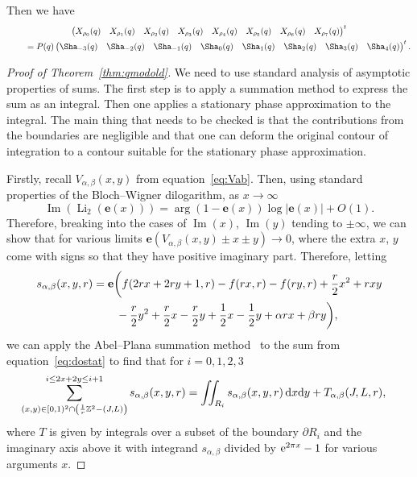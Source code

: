 \documentclass[pdftex]{sigma}
\numberwithin{equation}{section}
\def\BZ{\mathbb{Z}}
\def\be{\begin{equation}}
\def\ee{\end{equation}}
\def\Li{\mathrm{Li}}
\def\e{\mathbf e}
\def\WRT{\Sha}
\def\BZ{\mathbb Z}
\def\Li{\operatorname{Li}}
\def\Im{\operatorname{Im}}
\def\be{\begin{equation}}
\def\ee{\end{equation}}
\begin{document}
Then we have
\begin{gather}
\begin{pmatrix}
 X_{\rho_0}(q) &
 X_{\rho_1}(q) &
 X_{\rho_2}(q) &
 X_{\rho_3}(q) &
 X_{\rho_4}(q) &
 X_{\rho_5}(q) &
 X_{\rho_6}(q) &
 X_{\rho_7}(q)
\end{pmatrix}^{t}\label{eq:can.basis.Q}\\
\qquad{} =
P(q)
\begin{pmatrix}
 \WRT_{-3}(q) &
 \WRT_{-2}(q) &
 \WRT_{-1}(q) &
 \WRT_{0}(q) &
 \WRT_{1}(q) &
 \WRT_{2}(q) &
 \WRT_{3}(q) &
 \WRT_{4}(q)
\end{pmatrix}^{t}.\nonumber
\end{gather}
\begin{proof}[Proof of Theorem~\ref{thm:qmodold}]

We need to use standard analysis of asymptotic properties of sums. The first step is to apply a summation method to express the sum as an integral. Then one applies a stationary phase approximation to the integral. The main thing that needs to be checked is that the contributions from the boundaries are negligible and that one can deform the original contour of integration to a contour suitable for the stationary phase approximation.



Firstly, recall $V_{\alpha,\beta}(x,y)$ from equation~\eqref{eq:Vab}. Then, using standard properties of the Bloch--Wigner dilogarithm, as $x\rightarrow\infty$
\[
 \Im(\Li_2(\e(x)))
  =
 \arg(1-\e(x))\log|\e(x)|+O(1) .
\]
Therefore, breaking into the cases of $\Im(x)$, $\Im(y)$ tending to $\pm\infty$, we can show that for various limits $\e(V_{\alpha,\beta}(x,y)\pm x\pm y)\rightarrow 0$, where the extra $x$, $y$ come with signs so that they have positive imaginary part. Therefore, letting
\begin{align*}
& s_{\alpha,\beta}(x,y,r)  =
 \e\biggl(f(2rx+2ry+1,r)-f(rx,r)-f(ry,r)+\frac{r}{2}x^2+rxy\\
 &\hphantom{s_{\alpha,\beta}(x,y,r)  =\biggl(}{}
 -\frac{r}{2}y^2+\frac{r}{2}x-\frac{r}{2}y+\frac{1}{2}x-\frac{1}{2}y+\alpha rx+\beta ry\biggr) ,
\end{align*}
we can apply the Abel--Plana summation method~\cite[Section 8.3]{Olver} to the sum from equation~\eqref{eq:dostat} to find that for $i=0,1,2,3$
\be\label{eq:int.of.sum}
\begin{aligned}
 \sum_{(x,y)\in[0,1)^2\cap\left(\frac{1}{r}\BZ^2-(J,L)\right)}^{i\leq2x+2y\leq i+1}s_{\alpha,\beta}(x,y,r)
 & =
 \iint_{R_i} s_{\alpha,\beta}(x,y,r)\,{\rm d}x{\rm d}y
 +T_{\alpha,\beta}(J,L,r) ,
\end{aligned}
\ee
where $T$ is given by integrals over a subset of the boundary $\partial R_i$ and the imaginary axis above it with integrand $s_{\alpha,\beta}$ divided by ${\rm e}^{2\pi x}-1$ for various arguments $x$.


\end{proof}
\end{document}
